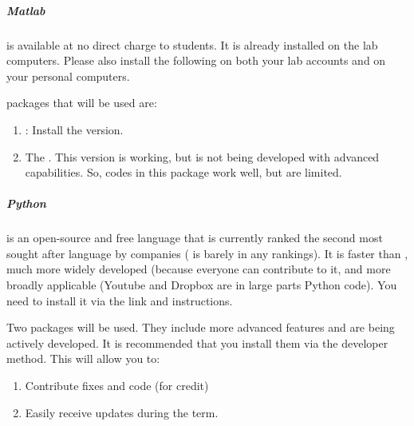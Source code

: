 \documentclass[letterpaper,10pt,english]{sphinxmanual}
\begin{document}
\subparagraph{Matlab}
\label{\detokenize{classes/ME7690Syll:matlab}}
 is available at no direct charge to students. It is already installed on the lab computers. Please also install the following on both your lab accounts and on your personal computers.

 packages that will be used are:
\begin{enumerate}
\item {} 
: Install the  version.

\item {} 
The . This version is working, but is not being developed with advanced capabilities. So, codes in this package work well, but are limited.

\end{enumerate}


\subparagraph{Python}
\label{\detokenize{classes/ME7690Syll:python}}
 is an open-source and free language that is currently ranked the second most sought after language by companies ( is barely in any rankings). It is faster than , much more widely developed (because everyone can contribute to it, and more broadly applicable (Youtube and Dropbox are in large parts Python code). You need to install it via the link and instructions.

Two  packages will be used. They include more advanced features and are being actively developed. It is recommended that you install them via the developer method. This will allow you to:
\begin{enumerate}
\item {} 
Contribute fixes and code (for credit)

\item {} 
Easily receive updates during the term.

\end{enumerate}
\end{document}

